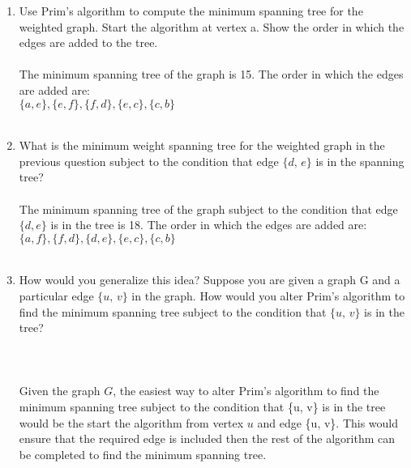 \documentclass{amsart}
\theoremstyle{definition}
\theoremstyle{Exercise}
\theoremstyle{remark}
\theoremstyle{rule}
\numberwithin{equation}{section}
\begin{document}
\begin{enumerate}[label=(\alph*)]
\item Use Prim's algorithm to compute the minimum spanning tree for the weighted graph. Start the algorithm at vertex a. Show the order in which the edges are added to the tree.\\\\
The minimum spanning tree of the graph is 15. The order in which the edges are added are:\\
$\{a, e\}, \{e, f\}, \{f, d\}, \{e, c\}, \{c, b\}$
\\\\
\item What is the minimum weight spanning tree for the weighted graph in the previous question subject to the condition that edge $\{d,\, e\}$ is in the spanning tree?\\\\
The minimum spanning tree of the graph subject to the condition that edge $\{d, e\}$ is in the tree is 18. The order in which the edges are added are:\\
$\{a, f\}, \{f, d\}, \{d, e\}, \{e, c\}, \{c, b\}$\\\\
\item How would you generalize this idea? Suppose you are given a graph G and a particular edge $\{u,\,v\}$ in the graph. How would you alter Prim's algorithm to find the minimum spanning tree subject to the condition that $\{u,\,v\}$ is in the tree?\\\\
\vspace*{0.2in}
\\\\
Given the graph $G$, the easiest way to alter Prim's algorithm to find the minimum spanning tree subject to the condition that \{u, v\}
is in the tree would be the start the algorithm from vertex $u$ and edge \{u, v\}. This would ensure that the required edge is included
then the rest of the algorithm can be completed to find the minimum spanning tree.\\
\\\\
\end{enumerate}
\end{document}
